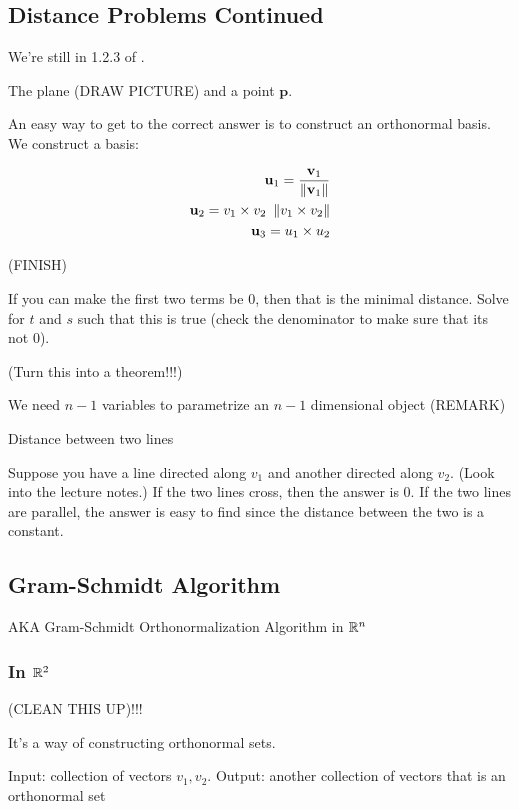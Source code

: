 \documentclass[11pt]{article}
\begin{document}

\subsection{Distance Problems Continued}
We're still in 1.2.3 of \cite{carlen}.


The plane (DRAW PICTURE) and a point $\bm{p}$.

An easy way to get to the correct answer is to construct an orthonormal basis.
We construct a basis:

\begin{align*}
  \textbf{u}_1 = \frac{\textbf{v}_1}{\left\lVert\textbf{v}_1\right\rVert} \\
  \textbf{u}_2 = v_1 \times v_2 \ \left\lVert v_1 \times v_2\right\rVert \\
  \textbf{u}_3 = u_1 \times u_2 \\
\end{align*}

(FINISH)

If you can make the first two terms be 0, then that is the minimal distance.
Solve for $t$ and $s$ such that this is true (check the denominator to make sure that its not 0).

(Turn this into a theorem!!!)


We need $n-1$ variables to parametrize an $n-1$ dimensional object (REMARK)


Distance between two lines

Suppose you have a line directed along $v_1$ and another directed along $v_2$.
(Look into the lecture notes.)
If the two lines cross, then the answer is 0.
If the two lines are parallel, the answer is easy to find since the distance between the two is a constant.

\subsection{Gram-Schmidt Algorithm}

AKA Gram-Schmidt Orthonormalization Algorithm in $\mathbb R^n$

\subsubsection{In $\mathbb R^2$}

(CLEAN THIS UP)!!!

It's a way of constructing orthonormal sets.

Input: collection of vectors $v_1, v_2$.
Output: another collection of vectors that is an orthonormal set
\end{document}
